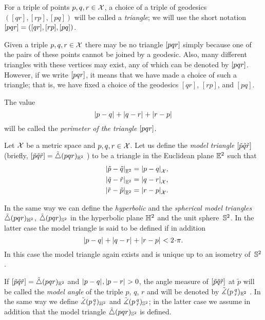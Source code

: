 For a triple of points $p,q,r\in \mathcal{X}$, a choice of a triple of geodesics $([q r], [r p], [p q])$ will be called a \emph{triangle}; we will use the short notation 
$[pqr]=([q r], [r p], [p q])$\index{$\trig {{*}}{{*}}{{*}}$}.

Given a triple $p,q,r\in \mathcal{X}$ there may be no triangle 
$[pqr]$ simply because one of the pairs of these points cannot be joined by a geodesic.
Also, many different triangles with these vertices may exist, any of which can be denoted by $[pqr]$.
However, if we write $[pqr]$, it means that we have made a choice of such a triangle; 
that is, we have  fixed a choice of the geodesics $[q r]$, $[r p]$, and $[p q]$.

The value 
\[\dist{p}{q}{}+\dist{q}{r}{}+\dist{r}{p}{}\]
will be called the {}\emph{perimeter of the triangle} $[pqr]$.

Let $\mathcal{X}$ be a metric space and 
$p,q,r\in \mathcal{X}$. 
Let us define the \emph{model triangle} $[\tilde p\tilde q\tilde r]$ 
(briefly, 
$[\tilde p\tilde q\tilde r]=\tilde\triangle(p q r)_{\mathbb{E}^2}$%
) to be a triangle in the Euclidean plane $\mathbb{E}^2$ such that
\begin{align*}\dist{\tilde p}{\tilde q}{\EE^2}&=\dist{p}{q}{\spc{X}},
\\
\quad\dist{\tilde q}{\tilde r}{\EE^2}&=\dist{q}{r}{\spc{X}},
\\
\quad\dist{\tilde r}{\tilde p}{\EE^2}&=\dist{r}{p}{\spc{X}}.
\end{align*}

In the same way we can define the \emph{hyperbolic} and the \emph{spherical model triangles} $\tilde\triangle(p q r)_{\mathbb{H}^2}$, $\tilde\triangle(p q r)_{\mathbb{S}^2}$
in the hyperbolic plane $\mathbb{H}^2$ and the unit sphere~$\mathbb{S}^2$.
In the latter case the model triangle is said to be defined if in addition
\[\dist{p}{q}{}+\dist{q}{r}{}+\dist{r}{p}{}< 2\cdot\pi.\]
In this case the model triangle again exists and is unique up to an isometry of~$\mathbb{S}^2$.

If 
$[\tilde p\tilde q\tilde r]=\tilde\triangle(p q r)_{\mathbb{E}^2}$ 
and $\dist{p}{q}{},\dist{p}{r}{}>0$, 
the angle measure of 
$[\tilde p\tilde q\tilde r]$ at $\tilde p$ 
will be called the \emph{model angle} of the triple $p$, $q$, $r$ and will be denoted by
$\tilde\measuredangle(p\,{}^{q}_{r})_{\mathbb{E}^2}$%
\index{$\tilde\measuredangle$!$\angk{{*}}{{*}}{{*}}$}.
In the same way we define $\tilde\measuredangle(p\,{}^{q}_{r})_{\mathbb{H}^2}$ and $\tilde\measuredangle(p\,{}^{q}_{r})_{\mathbb{S}^2}$;
in the latter case  we assume in addition that the model triangle $\tilde\triangle(p q r)_{\mathbb{S}^2}$ is defined.

